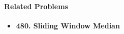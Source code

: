 \paragraph{Related Problems}
\begin{itemize}
\item \textbf{480. Sliding Window Median}
\end{itemize}